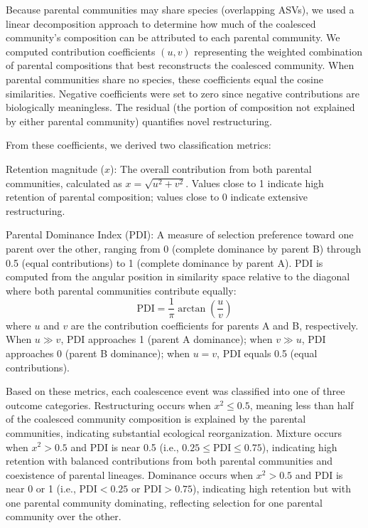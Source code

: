 Because parental communities may share species (overlapping ASVs), we used a linear decomposition approach to determine how much of the coalesced community's composition can be attributed to each parental community. We computed contribution coefficients $(u, v)$ representing the weighted combination of parental compositions that best reconstructs the coalesced community. When parental communities share no species, these coefficients equal the cosine similarities. Negative coefficients were set to zero since negative contributions are biologically meaningless. The residual (the portion of composition not explained by either parental community) quantifies novel restructuring.

From these coefficients, we derived two classification metrics:

Retention magnitude ($x$): The overall contribution from both parental communities, calculated as $x = \sqrt{u^2 + v^2}$. Values close to 1 indicate high retention of parental composition; values close to 0 indicate extensive restructuring.

Parental Dominance Index (PDI): A measure of selection preference toward one parent over the other, ranging from 0 (complete dominance by parent B) through 0.5 (equal contributions) to 1 (complete dominance by parent A). PDI is computed from the angular position in similarity space relative to the diagonal where both parental communities contribute equally:
\begin{equation}
\text{PDI} = \frac{1}{\pi} \arctan\left(\frac{u}{v}\right)
\label{eq:pdi}
\end{equation}
where $u$ and $v$ are the contribution coefficients for parents A and B, respectively. When $u \gg v$, PDI approaches 1 (parent A dominance); when $v \gg u$, PDI approaches 0 (parent B dominance); when $u = v$, PDI equals 0.5 (equal contributions).

Based on these metrics, each coalescence event was classified into one of three outcome categories. Restructuring occurs when $x^2 \leq 0.5$, meaning less than half of the coalesced community composition is explained by the parental communities, indicating substantial ecological reorganization. Mixture occurs when $x^2 > 0.5$ and PDI is near 0.5 (i.e., $0.25 \leq \text{PDI} \leq 0.75$), indicating high retention with balanced contributions from both parental communities and coexistence of parental lineages. Dominance occurs when $x^2 > 0.5$ and PDI is near 0 or 1 (i.e., $\text{PDI} < 0.25$ or $\text{PDI} > 0.75$), indicating high retention but with one parental community dominating, reflecting selection for one parental community over the other.

